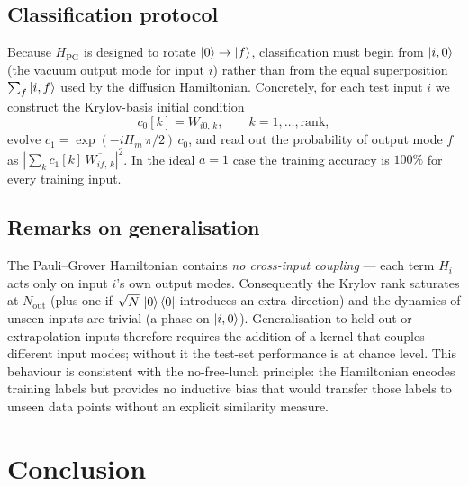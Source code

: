 \documentclass[11pt, a4paper]{article}
\begin{document}
\subsection{Classification protocol}

Because $H_{\mathrm{PG}}$ is designed to rotate $\ket{0}\to\ket{f}$,
classification must begin from $\ket{i,0}$ (the vacuum output mode for
input $i$) rather than from the equal superposition $\sum_f\ket{i,f}$ used
by the diffusion Hamiltonian. Concretely, for each test input $i$ we
construct the Krylov-basis initial condition
\[
c_0[k] = W_{i0,\,k},\qquad k=1,\dots,\mathrm{rank},
\]
evolve $c_1 = \exp(-i H_m\,\pi/2)\,c_0$, and read out the probability of
output mode $f$ as $|\sum_k c_1[k]\,\overline{W_{if,\,k}}|^2$. In the
ideal $a=1$ case the training accuracy is $100\%$ for every training input.

\subsection{Remarks on generalisation}

The Pauli--Grover Hamiltonian contains \emph{no cross-input coupling} ---
each term $H_i$ acts only on input $i$'s own output modes. Consequently
the Krylov rank saturates at $N_{\mathrm{out}}$ (plus one if
$\sqrt{N}\,\ket{0}\bra{0}$ introduces an extra direction) and the dynamics
of unseen inputs are trivial (a phase on $\ket{i,0}$). Generalisation to
held-out or extrapolation inputs therefore requires the addition of a
kernel that couples different input modes; without it the test-set
performance is at chance level. This behaviour is consistent with the
no-free-lunch principle: the Hamiltonian encodes training labels but
provides no inductive bias that would transfer those labels to unseen data
points without an explicit similarity measure.

\section{Conclusion}
\end{document}
